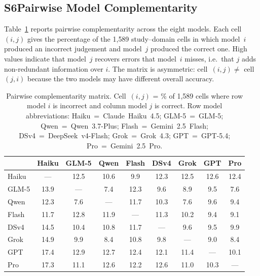 \documentclass[../main.tex]{subfiles}
\begin{document}
\subsection*{S6\quad Pairwise Model Complementarity}
\label{sec:si-pairwise}

Table~\ref{tab:pairwise} reports pairwise complementarity across the eight models.
Each cell~$(i,j)$ gives the percentage of the 1{,}589 study--domain cells in which
model~$i$ produced an incorrect judgement and model~$j$ produced the correct one.
High values indicate that model~$j$ recovers errors that model~$i$ misses, i.e.\
that $j$ adds non-redundant information over $i$.
The matrix is asymmetric: cell~$(i,j) \neq$ cell~$(j,i)$ because the two models may
have different overall accuracy.

\begin{table}
\centering
\caption{Pairwise complementarity matrix. Cell~$(i,j)$ = \% of 1{,}589 cells
where row model $i$ is incorrect and column model $j$ is correct.
Row model abbreviations: Haiku~=~Claude~Haiku~4.5; GLM-5~=~GLM-5;
Qwen~=~Qwen~3.7-Plus; Flash~=~Gemini~2.5~Flash; DSv4~=~DeepSeek~v4-Flash;
Grok~=~Grok~4.3; GPT~=~GPT-5.4; Pro~=~Gemini~2.5~Pro.}
\label{tab:pairwise}
\begin{tabular}{lcccccccc}
\toprule
 & \textbf{Haiku} & \textbf{GLM-5} & \textbf{Qwen} & \textbf{Flash} & \textbf{DSv4} & \textbf{Grok} & \textbf{GPT} & \textbf{Pro} \\
\midrule
Haiku &  ---  & 12.5 & 10.6 &  9.9 & 12.3 & 12.5 & 12.6 & 12.4 \\
GLM-5 & 13.9  &  ---  &  7.4 & 12.3 &  9.6 &  8.9 &  9.5 &  7.6 \\
Qwen  & 12.3  &  7.6  &  ---  & 11.7 & 10.3 &  7.6 &  9.6 &  9.4 \\
Flash & 11.7  & 12.8  & 11.9 &  ---  & 11.3 & 10.2 &  9.4 &  9.1 \\
DSv4  & 14.5  & 10.4  & 10.8 & 11.7 &  ---  &  9.6 &  9.5 &  9.9 \\
Grok  & 14.9  &  9.9  &  8.4 & 10.8 &  9.8 &  ---  &  9.0 &  8.4 \\
GPT   & 17.4  & 12.9  & 12.7 & 12.4 & 12.1 & 11.4 &  ---  & 10.1 \\
Pro   & 17.3  & 11.1  & 12.6 & 12.2 & 12.6 & 11.0 & 10.3 &  ---  \\
\bottomrule
\end{tabular}
\end{table}
\end{document}
